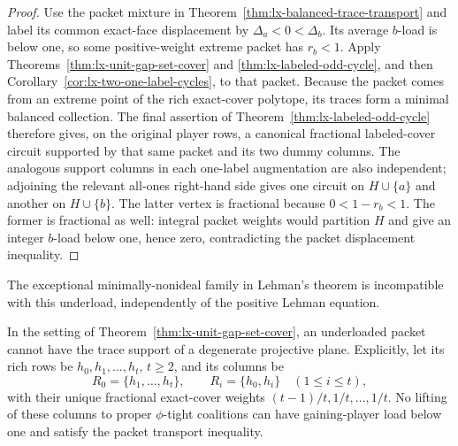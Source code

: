 \begin{proof}
Use the packet mixture in
Theorem~\ref{thm:lx-balanced-trace-transport} and label its common exact-face
displacement by $\Delta_a<0<\Delta_b$.  Its average $b$-load is below one,
so some positive-weight extreme packet has $r_b<1$.  Apply
Theorems~\ref{thm:lx-unit-gap-set-cover} and
\ref{thm:lx-labeled-odd-cycle}, and then
Corollary~\ref{cor:lx-two-one-label-cycles}, to that packet.
Because the packet comes from an extreme point of the rich exact-cover
polytope, its traces form a minimal balanced collection.  The final assertion
of Theorem~\ref{thm:lx-labeled-odd-cycle} therefore gives, on the original
player rows, a canonical fractional labeled-cover circuit supported by that
same packet and its two dummy columns.  The analogous support columns in
each one-label augmentation are also independent; adjoining the relevant
all-ones right-hand side gives one circuit on $H\cup\{a\}$ and another on
$H\cup\{b\}$.  The latter vertex is fractional because
$0<1-r_b<1$.  The former is fractional as well: integral packet weights
would partition $H$ and give an integer $b$-load below one, hence zero,
contradicting the packet displacement inequality.
\end{proof}

The exceptional minimally-nonideal family in Lehman's theorem is incompatible
with this underload, independently of the positive Lehman equation.

\begin{theorem}
\label{thm:lx-degenerate-mni-exclusion}
In the setting of Theorem~\ref{thm:lx-unit-gap-set-cover}, an underloaded
packet cannot have the trace support of a degenerate projective plane.
Explicitly, let its rich rows be $h_0,h_1,\ldots,h_t$, $t\geq2$, and its
columns be
\[
 R_0=\{h_1,\ldots,h_t\},
 \qquad R_i=\{h_0,h_i\}\quad(1\leq i\leq t),       \tag{DP-1}
 \label{eq:lx-degenerate-mni}
\]
with their unique fractional exact-cover weights
$(t-1)/t,1/t,\ldots,1/t$.  No lifting of these columns to proper
$\phi$-tight coalitions can have gaining-player load below one and satisfy
the packet transport inequality.
\end{theorem}

